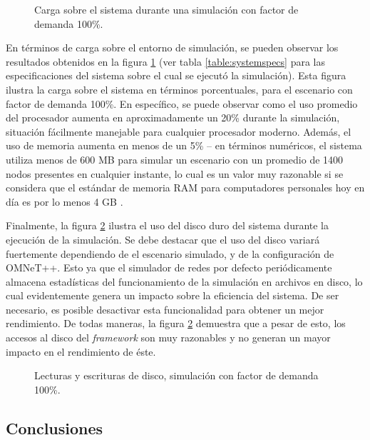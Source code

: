 \begin{figure}[tpb]
    \centering
    
    \caption[Carga sobre el sistema durante una simulación]{Carga sobre el sistema durante una simulación con factor de demanda 100\%.}
    \label{fig:systemload:cpuram}
\end{figure}

En términos de carga sobre el entorno de simulación, se pueden observar los resultados obtenidos en la figura \ref{fig:systemload:cpuram} (ver tabla \ref{table:systemspecs} para las especificaciones del sistema sobre el cual se ejecutó la simulación). Esta figura ilustra la carga sobre el sistema en términos porcentuales, para el escenario con factor de demanda 100\%. En específico, se puede observar como el uso promedio del procesador aumenta en aproximadamente un 20\% durante la simulación, situación fácilmente manejable para cualquier procesador moderno. Además, el uso de memoria aumenta en menos de un 5\% -- en términos numéricos, el sistema utiliza menos de 600 MB para simular un escenario con un promedio de 1400 nodos presentes en cualquier instante, lo cual es un valor muy razonable si se considera que el estándar de memoria RAM para computadores personales hoy en día es por lo menos 4 GB \autocite{steamhwsurvey, unityhardwaresurvey}.

Finalmente, la figura \ref{fig:systemload:io} ilustra el uso del disco duro del sistema durante la ejecución de la simulación. Se debe destacar que el uso del disco variará fuertemente dependiendo de el escenario simulado, y de la configuración de OMNeT++. Esto ya que el simulador de redes por defecto periódicamente almacena estadísticas del funcionamiento de la simulación en archivos en disco, lo cual evidentemente genera un impacto sobre la eficiencia del sistema. De ser necesario, es posible desactivar esta funcionalidad para obtener un mejor rendimiento. De todas maneras, la figura \ref{fig:systemload:io} demuestra que a pesar de esto, los accesos al disco del \emph{framework} son muy razonables y no generan un mayor impacto en el rendimiento de éste.

\begin{figure}[tpb]
    \centering
    
    \caption[I/O en disco durante simulación]{Lecturas y escrituras de disco, simulación con factor de demanda 100\%.}
    \label{fig:systemload:io}
\end{figure} 

\subsection{Conclusiones}

